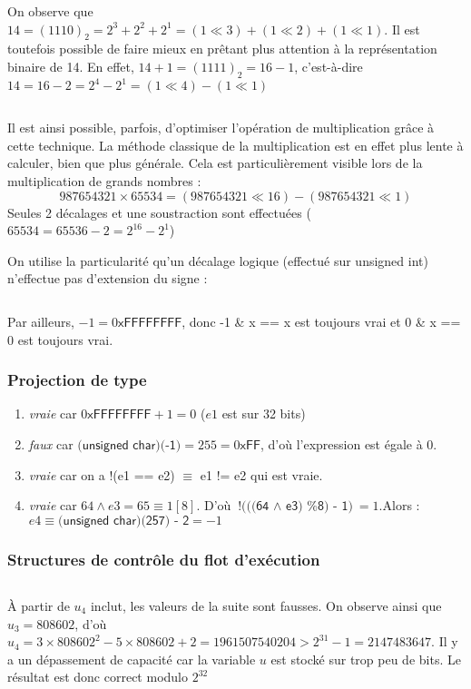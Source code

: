 \documentclass[../main.tex]{subfiles}
\begin{document}
 On observe que $14 = (1110)_{2} = 2^{3} + 2^{2} + 2^{1} = (1 \ll 3) + (1 \ll 2) + (1 \ll 1)$. Il est toutefois possible de faire mieux en prêtant plus attention à la représentation binaire de 14. En effet, $14 + 1 = (1111)_{2} = 16 - 1$, c'est-à-dire $14 = 16 - 2 = 2^{4} - 2^{1} = (1 \ll 4) - (1 \ll 1)$
\inputminted{c}{solutions/part2/chapter2/mult_decalage.c}
Il est ainsi possible, parfois, d'optimiser l'opération de multiplication grâce à cette technique. La méthode classique de la multiplication est en effet plus lente à calculer, bien que plus générale. Cela est particulièrement visible lors de la multiplication de grands nombres :
$$987654321\times{65534} = (987654321 \ll 16) - (987654321 \ll 1)$$
Seules 2 décalages et une soustraction sont effectuées ($65534 = 65536 - 2 = 2^{16} - 2^{1}$)
 
On utilise la particularité qu'un décalage logique (effectué sur \textsf{unsigned int}) n'effectue pas d'extension du signe :
\inputminted{c}{solutions/part2/chapter2/valeur_absolue.c}
Par ailleurs, $-1 = 0\textsf{xFFFFFFFF}$, donc \textsf{-1 \& x == x} est toujours vrai et \textsf{0 \& x == 0} est toujours vrai.
\subsubsection{Projection de type}
\begin{enumerate}
	\item \textit{vraie} car $0\textsf{xFFFFFFFF} + 1 = 0$ ($e1$ est sur 32 bits)
	\item \textit{faux} car $\textsf{(unsigned char)(-1)} = 255 = 0\textsf{xFF}$, d'où l'expression est égale à 0.
	\item \textit{vraie} car on a \textsf{!(e1 == e2)} $\equiv$ \textsf{e1 != e2} qui est vraie.
	\item \textit{vraie} car $64\wedge{e3} = 65 \equiv 1[8]$. D'où $\textsf{!(((64 $\wedge$ e3) \% 8) - 1)} = 1$.\newline Alors : $e4 \equiv{\textsf{(unsigned char)(257) - 2}} = -1$
\end{enumerate}
\subsubsection{Structures de contrôle du flot d'exécution}
\solution{}
\inputminted{c}{solutions/part2/chapter2/cours_structure_controle.c}
À partir de $u_{4}$ inclut, les valeurs de la suite sont fausses. On observe ainsi que $u_{3} = 808602$, d'où $u_{4} = 3\times808602^{2} - 5\times{808602} + 2 = 1961507540204 > 2^{31} - 1 = 2147483647$. Il y a un dépassement de capacité car la variable $u$ est stocké sur trop peu de bits. Le résultat est donc correct modulo $2^{32}$
 
\end{document}
